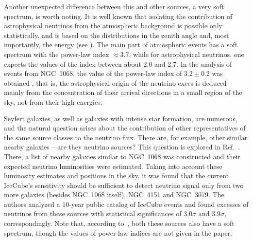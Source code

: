 \documentclass[a4paper,noshowpacs,noshowkeys,floatfix,twocolumn,preprintnumbers,nofootinbib]{revtex4-2}
\begin{document}
Another unexpected difference between this and other sources, a very soft spectrum, is worth noting. It is well known that isolating the contribution of astrophysical neutrinos from the atmospheric background is possible only statistically, and is based on the distributions in the zenith angle and, most importantly, the energy (see \cite{ST-UFN}). The main part of atmospheric events has a soft spectrum with the power-law index $\approx 3.7$, while for astrophysical neutrinos, one expects the values of the index between about 2.0 and 2.7. In the analysis of events from NGC~1068, the value of the power-law index of $3.2\pm 0.2$ was obtained \cite{IceCube-NGC1068}, that is, the astrophysical origin of the neutrino exces is deduced mainly from the concentration of their arrival directions in a small region of the sky, not from their high energies.

Seyfert galaxies, as well as galaxies with intense star formation, are numerous, and the natural question arises about the contribution of other representatives of the same source classes to the neutrino flux. There are, for example, other similar nearby galaxies -- are they neutrino sources? This question is explored in Ref.~\cite{SemikozSeyfert}. There, a list of nearby galaxies similar to NGC~1068 was constructed and their expected neutrino luminosities were estimated. Taking into account these luminosity estimates and positions in the sky, it was found that the current IceCube's sensitivity should be sufficient to detect neutrino signal only from two more galaxies (besides NGC~1068 itself), NGC~4151 and NGC~3079. The authors analyzed a 10-year public catalog \cite{IceCube10yrDataPaper} of IceCube events and found excesses of neutrinos from these sources with statistical significances of $3.0\sigma$ and $3.9\sigma$, correspondingly. Note that, according to~\cite{SemikozSeyfert}, both these sources also have a soft spectrum, though the values of power-law indices are not given in the paper.
\end{document}
